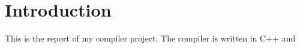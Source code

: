 \section{Introduction}
This is the report of my compiler project. The compiler is written in C++ and